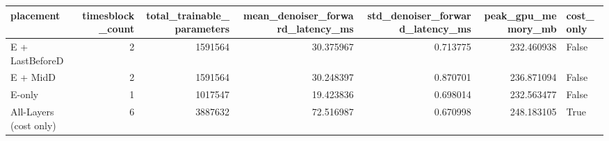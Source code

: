 \begin{tabular}{lrrrrrl}
\toprule
             placement &  timesblock\_count &  total\_trainable\_parameters &  mean\_denoiser\_forward\_latency\_ms &  std\_denoiser\_forward\_latency\_ms &  peak\_gpu\_memory\_mb &  cost\_only \\
\midrule
       E + LastBeforeD &                 2 &                     1591564 &                         30.375967 &                         0.713775 &          232.460938 &      False \\
              E + MidD &                 2 &                     1591564 &                         30.248397 &                         0.870701 &          236.871094 &      False \\
                E-only &                 1 &                     1017547 &                         19.423836 &                         0.698014 &          232.563477 &      False \\
All-Layers (cost only) &                 6 &                     3887632 &                         72.516987 &                         0.670998 &          248.183105 &       True \\
\bottomrule
\end{tabular}


